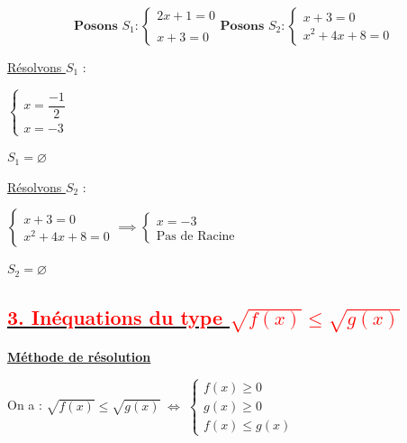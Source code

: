 \documentclass[12pt,a4paper]{article}
\newcounter{solution}
\begin{document}
\[
\textbf{Posons }
S_{1}:
\begin{cases}
2x + 1 = 0 \\ \\
x + 3 = 0 
\end{cases}
\textbf{Posons }
S_{2}:
\begin{cases} 
x + 3 = 0 \\[3mm]
x^2 + 4x + 8 = 0
\end{cases}
\]

\underline{Résolvons \( S_1 \)} :

\(
\begin{cases}
x = \dfrac{-1}{2} \\
x =  -3 
\end{cases} 
\)


    
$S_1 = \varnothing$


\underline{Résolvons \( S_2 \)} :

\(
\begin{cases} 
x + 3 = 0 \\[3mm]
x^2 + 4x + 8 = 0
\end{cases}
\implies
\begin{cases} 
x = -3 \\[3mm]
\text{Pas de Racine }
\end{cases}
\)


$S_2 = \varnothing$

\subsection*{\underline{\textbf{\textcolor{red}{3. Inéquations du type \( \sqrt{f(x)} \leq \sqrt{g(x)} \)}}}}


\underline{\textbf{Méthode de résolution}}

On a : $\sqrt{f(x)}\leq\sqrt{g(x)}\;\Leftrightarrow\;\left\lbrace\begin{array}{lll} f(x) \geq 0 \\ g(x)\geq 0\\ f(x)\leq g(x)\end{array}\right.$
\end{document}
